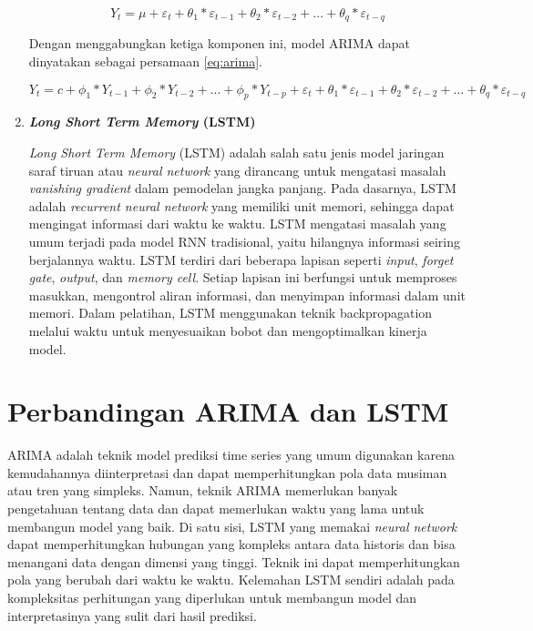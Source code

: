 \begin{enumerate}
    \begin{equation}
        \label{eq:ma}
        Y_t = \mu + \varepsilon_t + \theta_1 * \varepsilon_{t-1} + \theta_2 * \varepsilon_{t-2} + ... + \theta_q * \varepsilon_{t-q}
    \end{equation}

    Dengan menggabungkan ketiga komponen ini, model ARIMA dapat dinyatakan sebagai persamaan \ref{eq:arima}.

    \begin{equation}
        \label{eq:arima}
        Y_t = c + \phi_1 * Y_{t-1} + \phi_2 * Y_{t-2} + ... + \phi_p * Y_{t-p} + \varepsilon_t + \theta_1 * \varepsilon_{t-1} + \theta_2 * \varepsilon_{t-2} + ... + \theta_q * \varepsilon_{t-q}
    \end{equation}

    \item \textbf{\textit{Long Short Term Memory} (LSTM)}
    
    \textit{Long Short Term Memory} (LSTM) adalah salah satu jenis model jaringan saraf tiruan atau \textit{neural network} yang dirancang untuk mengatasi masalah \textit{vanishing gradient} dalam pemodelan jangka panjang. Pada dasarnya, LSTM adalah \textit{recurrent neural network} yang memiliki unit memori, sehingga dapat mengingat informasi dari waktu ke waktu. LSTM mengatasi masalah yang umum terjadi pada model RNN tradisional, yaitu hilangnya informasi seiring berjalannya waktu. LSTM terdiri dari beberapa lapisan seperti \textit{input}, \textit{forget gate}, \textit{output}, dan \textit{memory cell}. Setiap lapisan ini berfungsi untuk memproses masukkan, mengontrol aliran informasi, dan menyimpan informasi dalam unit memori. Dalam pelatihan, LSTM menggunakan teknik backpropagation melalui waktu untuk menyesuaikan bobot dan mengoptimalkan kinerja model. 

\end{enumerate}

\section{Perbandingan ARIMA dan LSTM}

ARIMA adalah teknik model prediksi time series yang umum digunakan karena kemudahannya diinterpretasi dan dapat memperhitungkan pola data musiman atau tren yang simpleks. Namun, teknik ARIMA memerlukan banyak pengetahuan tentang data dan dapat memerlukan waktu yang lama untuk membangun model yang baik. Di satu sisi, LSTM yang memakai \textit{neural network} dapat memperhitungkan hubungan yang kompleks antara data historis dan bisa menangani data dengan dimensi yang tinggi. Teknik ini dapat memperhitungkan pola yang berubah dari waktu ke waktu. Kelemahan LSTM sendiri adalah pada kompleksitas perhitungan yang diperlukan untuk membangun model dan interpretasinya yang sulit dari hasil prediksi.

